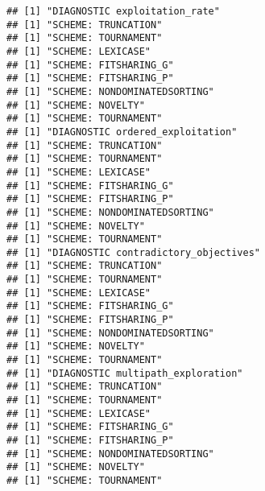 \documentclass[]{book}
\newenvironment{Shaded}{\begin{snugshade}}{\end{snugshade}}
\newcommand{\CharTok}[1]{\textcolor[rgb]{0.31,0.60,0.02}{#1}}
\newcommand{\CommentTok}[1]{\textcolor[rgb]{0.56,0.35,0.01}{\textit{#1}}}
\newcommand{\ControlFlowTok}[1]{\textcolor[rgb]{0.13,0.29,0.53}{\textbf{#1}}}
\newcommand{\DataTypeTok}[1]{\textcolor[rgb]{0.13,0.29,0.53}{#1}}
\newcommand{\DecValTok}[1]{\textcolor[rgb]{0.00,0.00,0.81}{#1}}
\newcommand{\KeywordTok}[1]{\textcolor[rgb]{0.13,0.29,0.53}{\textbf{#1}}}
\newcommand{\NormalTok}[1]{#1}
\newcommand{\OperatorTok}[1]{\textcolor[rgb]{0.81,0.36,0.00}{\textbf{#1}}}
\newcommand{\StringTok}[1]{\textcolor[rgb]{0.31,0.60,0.02}{#1}}
\begin{document}
\begin{Shaded}
\end{Shaded}

\begin{verbatim}
## [1] "DIAGNOSTIC exploitation_rate"
## [1] "SCHEME: TRUNCATION"
## [1] "SCHEME: TOURNAMENT"
## [1] "SCHEME: LEXICASE"
## [1] "SCHEME: FITSHARING_G"
## [1] "SCHEME: FITSHARING_P"
## [1] "SCHEME: NONDOMINATEDSORTING"
## [1] "SCHEME: NOVELTY"
## [1] "SCHEME: TOURNAMENT"
## [1] "DIAGNOSTIC ordered_exploitation"
## [1] "SCHEME: TRUNCATION"
## [1] "SCHEME: TOURNAMENT"
## [1] "SCHEME: LEXICASE"
## [1] "SCHEME: FITSHARING_G"
## [1] "SCHEME: FITSHARING_P"
## [1] "SCHEME: NONDOMINATEDSORTING"
## [1] "SCHEME: NOVELTY"
## [1] "SCHEME: TOURNAMENT"
## [1] "DIAGNOSTIC contradictory_objectives"
## [1] "SCHEME: TRUNCATION"
## [1] "SCHEME: TOURNAMENT"
## [1] "SCHEME: LEXICASE"
## [1] "SCHEME: FITSHARING_G"
## [1] "SCHEME: FITSHARING_P"
## [1] "SCHEME: NONDOMINATEDSORTING"
## [1] "SCHEME: NOVELTY"
## [1] "SCHEME: TOURNAMENT"
## [1] "DIAGNOSTIC multipath_exploration"
## [1] "SCHEME: TRUNCATION"
## [1] "SCHEME: TOURNAMENT"
## [1] "SCHEME: LEXICASE"
## [1] "SCHEME: FITSHARING_G"
## [1] "SCHEME: FITSHARING_P"
## [1] "SCHEME: NONDOMINATEDSORTING"
## [1] "SCHEME: NOVELTY"
## [1] "SCHEME: TOURNAMENT"
\end{verbatim}
\end{document}
